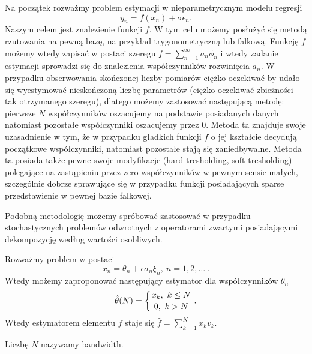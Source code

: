 \documentclass[12pt]{article}
\begin{document}
Na początek rozważmy problem estymacji w nieparametrycznym modelu regresji
\begin{displaymath}
y_n=f(x_n)+\sigma\epsilon_n.
\end{displaymath}
Naszym celem jest znalezienie funkcji $f$. W tym celu możemy posłużyć się metodą rzutowania na pewną bazę, na przykład trygonometryczną lub falkową. Funkcję $f$ możemy wtedy zapisać w postaci szeregu $f=\sum_{n=1}^{\infty}a_n\phi_n$ i wtedy zadanie estymacji sprowadzi się do znalezienia współczynników rozwinięcia $a_n$. W przypadku obserwowania skończonej liczby pomiarów ciężko oczekiwać by udało się wyestymować nieskończoną liczbę parametrów (ciężko oczekiwać zbieżności tak otrzymanego szeregu), dlatego możemy zastosować następującą metodę: pierwsze $N$ współczynników oszacujemy na podstawie posiadanych danych natomiast pozostałe współczynniki oszacujemy przez $0$. Metoda ta znajduje swoje uzasadnienie w tym, że w przypadku gładkich funkcji $f$ o jej kształcie decydują początkowe współczynniki, natomiast pozostałe stają się zaniedbywalne. Metoda ta posiada także pewne swoje modyfikacje (hard tresholding, soft tresholding) polegające na zastąpieniu przez zero współczynników w pewnym sensie małych, szczególnie dobrze sprawujące się w przypadku funkcji posiadających sparse przedstawienie w pewnej bazie falkowej.

Podobną metodologię możemy spróbować zastosować w przypadku stochastycznych problemów odwrotnych z operatorami zwartymi posiadającymi dekompozycję według wartości osobliwych.

Rozważmy problem w postaci 
\begin{displaymath}
x_n=\theta_n+\epsilon\sigma_n\xi_n,\ n=1,2,\dots\ .
\end{displaymath}
Wtedy możemy zaproponować następujący estymator dla współczynników $\theta_n$
\begin{displaymath}
\hat{\theta}(N)=\left\{{x_k,\ k\leq N}\atop {0,\ k>N}\right. .
\end{displaymath}
Wtedy estymatorem elementu $f$ staje się $\hat{f}=\sum_{k=1}^Nx_kv_k$.

Liczbę $N$ nazywamy bandwidth.
\end{document}
